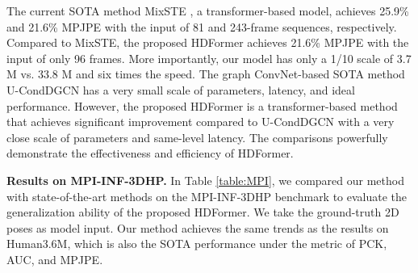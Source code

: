 \documentclass{article}
\begin{document}
The current SOTA method MixSTE \cite{ZhangCVPR22MixSTE}, a transformer-based model, achieves 25.9\% and 21.6\% MPJPE with the input of 81 and 243-frame sequences, respectively. Compared to MixSTE, the proposed HDFormer achieves 21.6\% MPJPE with the input of only 96 frames. More importantly, our model has only a 1/10 scale of 3.7 M vs. 33.8 M and six times the speed. The graph ConvNet-based SOTA method U-CondDGCN has a very small scale of parameters, latency, and ideal performance. However, the proposed HDFormer is a transformer-based method that achieves significant improvement compared to U-CondDGCN with a very close scale of parameters and same-level latency.  The comparisons powerfully demonstrate the effectiveness and efficiency of HDFormer. 


\noindent \textbf{Results on MPI-INF-3DHP.} In Table \ref{table:MPI}, we compared our method with state-of-the-art methods on the MPI-INF-3DHP benchmark to evaluate the generalization ability of the proposed HDFormer. We take the ground-truth 2D poses as model input. Our method achieves the same trends as the results on Human3.6M, which is also the SOTA performance under the metric of PCK, AUC, and MPJPE.

\begin{table}
    \scriptsize
    \centering
    \caption{\small Results on MPI-INF-3DHP with three metrics.}
    \vspace{-0.1in}
    \label{table:MPI}
    \vspace{-4mm}
\end{table}
\end{document}

